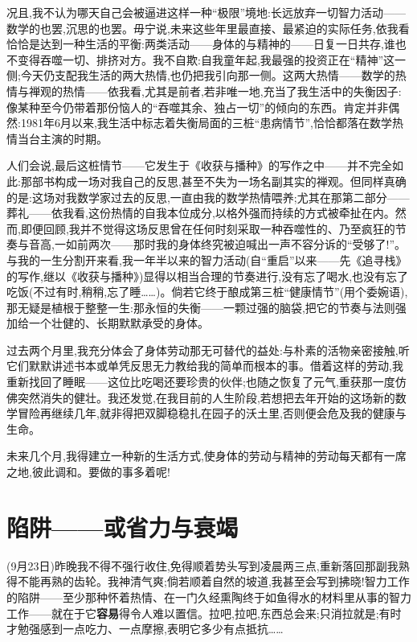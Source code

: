 况且,我不认为哪天自己会被逼进这样一种“极限”境地:长远放弃一切智力活动——数学的也罢,沉思的也罢。毋宁说,未来这些年里最直接、最紧迫的实际任务,依我看恰恰是达到一种生活的平衡:两类活动——身体的与精神的——日复一日共存,谁也不变得吞噬一切、排挤对方。我不自欺:自我童年起,我最强的投资正在“精神”这一侧;今天仍支配我生活的两大热情,也仍把我引向那一侧。这两大热情——数学的热情与禅观的热情——依我看,尤其是前者,若非唯一地,充当了我生活中的失衡因子:像某种至今仍带着那份恼人的“吞噬其余、独占一切”的倾向的东西。肯定并非偶然:1981年6月以来,我生活中标志着失衡局面的三桩“患病情节”,恰恰都落在数学热情当台主演的时期。

人们会说,最后这桩情节——它发生于《收获与播种》的写作之中——并不完全如此:那部书构成一场对我自己的反思,甚至不失为一场名副其实的禅观。但同样真确的是:这场对我数学家过去的反思,一直由我的数学热情喂养;尤其在那第二部分——葬礼——依我看,这份热情的自我本位成分,以格外强而持续的方式被牵扯在内。然而,即便回顾,我并不觉得这场反思曾在任何时刻采取一种吞噬性的、乃至疯狂的节奏与音高,一如前两次——那时我的身体终究被迫喊出一声不容分诉的“受够了!”。与我的一生分割开来看,我一年半以来的智力活动(自“重启”以来——先《追寻栈》的写作,继以《收获与播种》)显得以相当合理的节奏进行,没有忘了喝水,也没有忘了吃饭(不过有时,稍稍,忘了睡……)。倘若它终于酿成第三桩“健康情节”(用个委婉语),那无疑是植根于整整一生:那永恒的失衡——一颗过强的脑袋,把它的节奏与法则强加给一个壮健的、长期默默承受的身体。

\dmark{}过去两个月里,我充分体会了身体劳动那无可替代的益处:与朴素的活物亲密接触,听它们默默讲述书本或单凭反思无力教给我的简单而根本的事。借着这样的劳动,我重新找回了睡眠——这位比吃喝还要珍贵的伙伴;也随之恢复了元气,重获那一度仿佛突然消失的健壮。我还发觉,在我目前的人生阶段,若想把去年开始的这场新的数学冒险再继续几年,就非得把双脚稳稳扎在园子的沃土里,否则便会危及我的健康与生命。

未来几个月,我得建立一种新的生活方式,使身体的劳动与精神的劳动每天都有一席之地,彼此调和。要做的事多着呢!

\section{陷阱——或省力与衰竭}


(9月23日)昨晚我不得不强行收住,免得顺着势头写到凌晨两三点,重新落回那副我熟得不能再熟的齿轮。我神清气爽;倘若顺着自然的坡道,我甚至会写到拂晓!智力工作的陷阱——至少那种怀着热情、在一门久经熏陶终于如鱼得水的材料里从事的智力工作——就在于它\textbf{容易}得令人难以置信。拉吧,拉吧,东西总会来;只消拉就是;有时才勉强感到一点吃力、一点摩擦,表明它多少有点抵抗……

